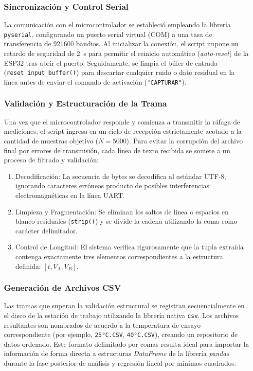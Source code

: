 \documentclass[conference]{IEEEtran}
\begin{document}
\subsubsection{Sincronización y Control Serial}
La comunicación con el microcontrolador se estableció empleando la librería \texttt{pyserial}, configurando un puerto serial virtual (COM) a una tasa de transferencia de \num{921600} baudios. Al inicializar la conexión, el script impone un retardo de seguridad de \SI{2}{\second} para permitir el reinicio automático (\textit{auto-reset}) de la ESP32 tras abrir el puerto. Seguidamente, se limpia el búfer de entrada (\texttt{reset\_input\_buffer()}) para descartar cualquier ruido o dato residual en la línea antes de enviar el comando de activación (\texttt{"CAPTURAR"}).

\subsubsection{Validación y Estructuración de la Trama}
Una vez que el microcontrolador responde y comienza a transmitir la ráfaga de mediciones, el script ingresa en un ciclo de recepción estrictamente acotado a la cantidad de muestras objetivo ($N = 5000$). Para evitar la corrupción del archivo final por errores de transmisión, cada línea de texto recibida se somete a un proceso de filtrado y validación:

\begin{enumerate}
    \item Decodificación: La secuencia de bytes se decodifica al estándar UTF-8, ignorando caracteres erróneos producto de posibles interferencias electromagnéticas en la línea UART.
    \item Limpieza y Fragmentación: Se eliminan los saltos de línea o espacios en blanco residuales (\texttt{strip()}) y se divide la cadena utilizando la coma como carácter delimitador.
    \item Control de Longitud: El sistema verifica rigurosamente que la tupla extraída contenga exactamente tres elementos correspondientes a la estructura definida: $[t, V_A, V_B]$. 
\end{enumerate}

\subsubsection{Generación de Archivos CSV}
Las tramas que superan la validación estructural se registran secuencialmente en el disco de la estación de trabajo utilizando la librería nativa \texttt{csv}. Los archivos resultantes son nombrados de acuerdo a la temperatura de ensayo correspondiente (por ejemplo, \texttt{25°C.CSV}, \texttt{40°C.CSV}), creando un repositorio de datos ordenado. Este formato delimitado por comas resulta ideal para importar la información de forma directa a estructuras \textit{DataFrame} de la librería \textit{pandas} durante la fase posterior de análisis y regresión lineal por mínimos cuadrados.
\end{document}
